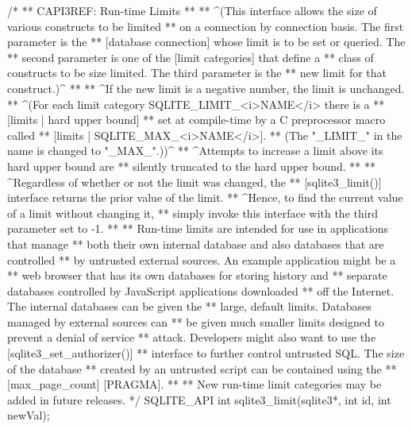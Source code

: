 \begin{Codex}[label=sqlite3.h,numbers=left]
{/*
** CAPI3REF: Run-time Limits
**
** ^(This interface allows the size of various constructs to be limited
** on a connection by connection basis.  The first parameter is the
** [database connection] whose limit is to be set or queried.  The
** second parameter is one of the [limit categories] that define a
** class of constructs to be size limited.  The third parameter is the
** new limit for that construct.)^
**
** ^If the new limit is a negative number, the limit is unchanged.
** ^(For each limit category SQLITE_LIMIT_<i>NAME</i> there is a 
** [limits | hard upper bound]
** set at compile-time by a C preprocessor macro called
** [limits | SQLITE_MAX_<i>NAME</i>].
** (The "_LIMIT_" in the name is changed to "_MAX_".))^
** ^Attempts to increase a limit above its hard upper bound are
** silently truncated to the hard upper bound.
**
** ^Regardless of whether or not the limit was changed, the 
** [sqlite3_limit()] interface returns the prior value of the limit.
** ^Hence, to find the current value of a limit without changing it,
** simply invoke this interface with the third parameter set to -1.
**
** Run-time limits are intended for use in applications that manage
** both their own internal database and also databases that are controlled
** by untrusted external sources.  An example application might be a
** web browser that has its own databases for storing history and
** separate databases controlled by JavaScript applications downloaded
** off the Internet.  The internal databases can be given the
** large, default limits.  Databases managed by external sources can
** be given much smaller limits designed to prevent a denial of service
** attack.  Developers might also want to use the [sqlite3_set_authorizer()]
** interface to further control untrusted SQL.  The size of the database
** created by an untrusted script can be contained using the
** [max_page_count] [PRAGMA].
**
** New run-time limit categories may be added in future releases.
*/
SQLITE_API int sqlite3_limit(sqlite3*, int id, int newVal);

}
\end{Codex}
